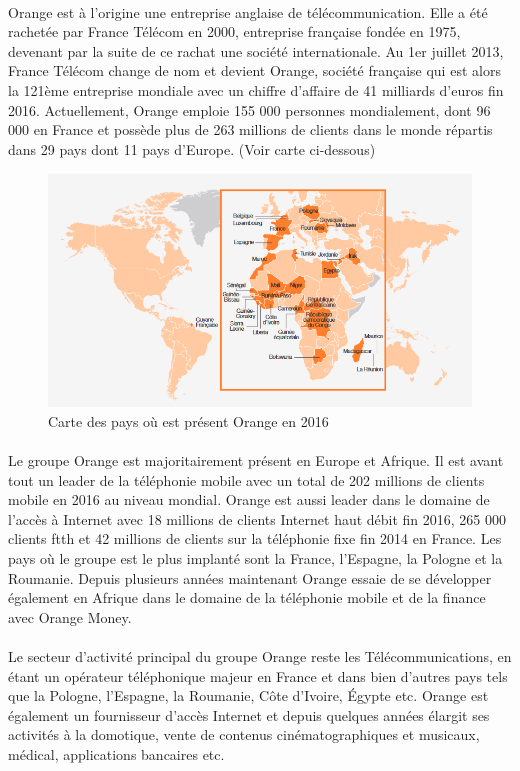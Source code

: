 \documentclass[12pt,a4paper]{report}
\begin{document}
\paragraph*{}
Orange est à l’origine une entreprise anglaise de télécommunication. Elle a été rachetée par France Télécom en 2000, entreprise française fondée en 1975, devenant par la suite de ce rachat une société internationale. Au 1er juillet 2013, France Télécom change de nom et devient Orange, société française qui est alors la 121ème entreprise mondiale avec un chiffre d’affaire de 41 milliards d’euros fin 2016. Actuellement, Orange emploie 155 000 personnes mondialement, dont 96 000 en France et possède plus de 263 millions de clients dans le monde répartis dans 29 pays dont 11 pays d’Europe. (Voir carte ci-dessous)
\begin{figure}[!ht]
    \center
    \includegraphics[scale=0.75]{./img/world_orange_2016.PNG}
    \caption{Carte des pays où est présent Orange en 2016}
\end{figure}
\paragraph*{}
Le groupe Orange est majoritairement présent en Europe et Afrique. Il est avant tout un leader de la téléphonie mobile avec un total de 202 millions de clients mobile en 2016 au niveau mondial. Orange est aussi leader dans le domaine de l’accès à Internet avec 18 millions de clients Internet haut débit fin 2016, 265 000 clients \gls{ftth} et 42 millions de clients sur la téléphonie fixe fin 2014 en France. Les pays où le groupe est le plus implanté sont la France, l’Espagne, la Pologne et la Roumanie. Depuis plusieurs années maintenant Orange essaie de se développer également en Afrique dans le domaine de la téléphonie mobile et de la finance avec Orange Money.
\paragraph*{}
Le secteur d’activité principal du groupe Orange reste les Télécommunications, en étant un opérateur téléphonique majeur en France et dans bien d’autres pays tels que la Pologne, l’Espagne, la Roumanie, Côte d’Ivoire, Égypte etc. Orange est également un fournisseur d’accès Internet et depuis quelques années élargit ses activités à la domotique, vente de contenus cinématographiques et musicaux, médical, applications bancaires etc.
\end{document}
